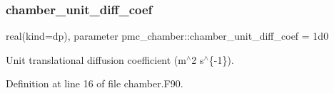 \subsubsection{\texorpdfstring{chamber\+\_\+unit\+\_\+diff\+\_\+coef}{chamber\_unit\_diff\_coef}}
{\footnotesize\ttfamily real(kind=dp), parameter pmc\+\_\+chamber\+::chamber\+\_\+unit\+\_\+diff\+\_\+coef = 1d0}



Unit translational diffusion coefficient (m$^\wedge$2 s$^\wedge$\{-\/1\}). 



Definition at line 16 of file chamber.\+F90.

